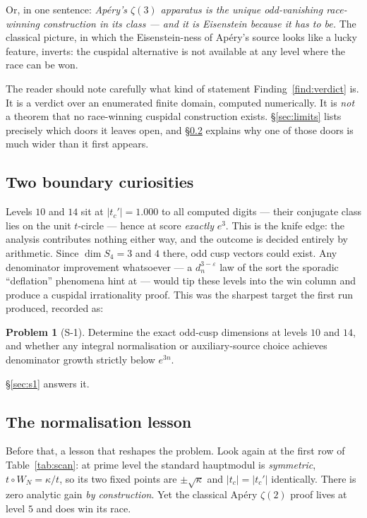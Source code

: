 \documentclass[11pt,reqno]{amsart}
\theoremstyle{plain}
\theoremstyle{definition}
\newtheorem{problem}[theorem]{Problem}
\theoremstyle{remark}
\newcommand{\eps}{\varepsilon}
\newcommand{\dn}{d_n}
\newcommand{\tc}{t_c}
\newcommand{\tcp}{t_c'}
\begin{document}
Or, in one sentence: \emph{Ap\'ery's $\zeta(3)$ apparatus is the unique
odd-vanishing race-winning construction in its class --- and it is
Eisenstein because it has to be.} The classical picture, in which the
Eisenstein-ness of Ap\'ery's source looks like a lucky feature, inverts:
the cuspidal alternative is not available at any level where the race can
be won.

The reader should note carefully what kind of statement
Finding~\ref{find:verdict} is. It is a verdict over an enumerated finite
domain, computed numerically. It is \emph{not} a theorem that no
race-winning cuspidal construction exists. \S\ref{sec:limits} lists
precisely which doors it leaves open, and \S\ref{sec:normalisation}
explains why one of those doors is much wider than it first appears.

\subsection{Two boundary curiosities}

Levels $10$ and $14$ sit at $|\tcp|=1.000$ to all computed digits ---
their conjugate class lies on the unit $t$-circle --- hence at score
\emph{exactly} $e^3$. This is the knife edge: the analysis contributes
nothing either way, and the outcome is decided entirely by arithmetic.
Since $\dim S_4=3$ and $4$ there, odd cusp vectors could exist. Any
denominator improvement whatsoever --- a $\dn^{3-\eps}$ law of the sort the
sporadic ``deflation'' phenomena hint at --- would tip these levels into
the win column and produce a cuspidal irrationality proof. This was the
sharpest target the first run produced, recorded as:

\begin{problem}[S-1]
\label{prob:s1}
Determine the exact odd-cusp dimensions at levels $10$ and $14$, and
whether any integral normalisation or auxiliary-source choice achieves
denominator growth strictly below $e^{3n}$.
\end{problem}

\S\ref{sec:s1} answers it.

\subsection{The normalisation lesson}
\label{sec:normalisation}

Before that, a lesson that reshapes the problem. Look again at the first
row of Table~\ref{tab:scan}: at prime level the standard hauptmodul is
\emph{symmetric}, $t\circ W_N=\kappa/t$, so its two fixed points are
$\pm\sqrt\kappa$ and $|\tc|=|\tcp|$ identically. There is zero analytic
gain \emph{by construction}. Yet the classical Ap\'ery $\zeta(2)$ proof
lives at level $5$ and does win its race.
\end{document}
